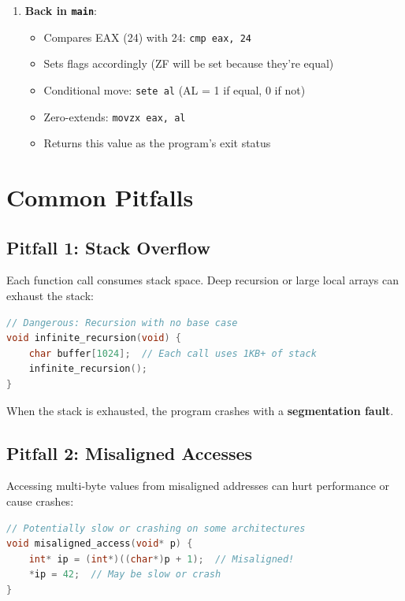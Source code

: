 \begin{enumerate}
  \item \textbf{Back in \texttt{main}}:
    \begin{itemize}
      \item Compares EAX (24) with 24: \texttt{cmp eax, 24}
      \item Sets flags accordingly (ZF will be set because they're equal)
      \item Conditional move: \texttt{sete al} (AL = 1 if equal, 0 if not)
      \item Zero-extends: \texttt{movzx eax, al}
      \item Returns this value as the program's exit status
    \end{itemize}
\end{enumerate}

\section{Common Pitfalls}

\subsection{Pitfall 1: Stack Overflow}

Each function call consumes stack space. Deep recursion or large local arrays can exhaust the stack:

\begin{lstlisting}[language=C]
// Dangerous: Recursion with no base case
void infinite_recursion(void) {
    char buffer[1024];  // Each call uses 1KB+ of stack
    infinite_recursion();
}
\end{lstlisting}

When the stack is exhausted, the program crashes with a \textbf{segmentation fault}.

\subsection{Pitfall 2: Misaligned Accesses}

Accessing multi-byte values from misaligned addresses can hurt performance or cause crashes:

\begin{lstlisting}[language=C]
// Potentially slow or crashing on some architectures
void misaligned_access(void* p) {
    int* ip = (int*)((char*)p + 1);  // Misaligned!
    *ip = 42;  // May be slow or crash
}
\end{lstlisting}

